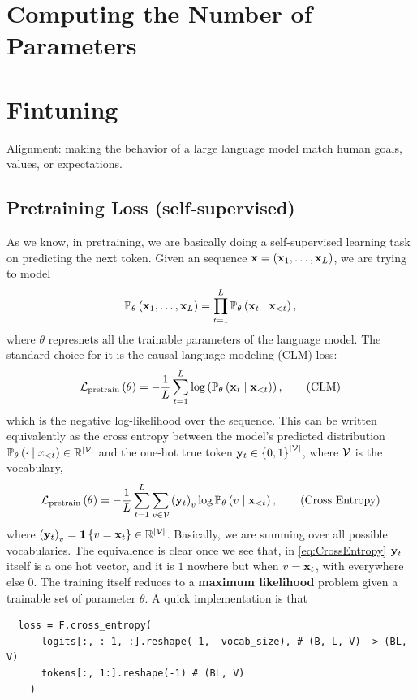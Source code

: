\documentclass[11pt]{article}  %
\begin{document}
\section{Computing the Number of Parameters}


\section{Fintuning}
Alignment: making the behavior of a large language model match human goals, values, or expectations.


\subsection{Pretraining Loss (self-supervised)}
As we know, in pretraining, we are basically doing a self-supervised learning task on predicting the next token.
Given an sequence $\mathbf{x} = (\mathbf{x}_1, \hdots, \mathbf{x}_L)$, we are trying to model 
\begin{align*}
  \mathbb{P}_{\theta}\left( \mathbf{x}_1, \hdots, \mathbf{x}_L \right) = \prod_{t=1}^L \mathbb{P}_{\theta}\left( \mathbf{x}_t \mid \mathbf{x}_{< t} \right),
\end{align*}
where $\theta$ represnets all the trainable parameters of the language model. 
The standard choice for it is the causal language modeling (CLM) loss:
\begin{align}
  \label{eq:CLM}
  \mathcal{L}_{\text{pretrain}} \left( \theta \right) = -\frac{1}{L}\sum_{t=1}^{L}\log\left( \mathbb{P}_{\theta}\left( \mathbf{x}_t \mid \mathbf{x}_{<t} \right) \right), \tag{CLM}
\end{align}
which is the negative log-likelihood over the sequence.
This can be written equivalently as the cross entropy between the model's predicted distribution $\mathbb{P}_{\theta}\left( \cdot \mid x_{< t} \right) \in \mathbb{R}^{\lvert\mathcal{V} \rvert}$ and the one-hot true token $\mathbf{y}_t \in \left\{ 0, 1 \right\}^{\lvert\mathcal{V} \rvert}$, where $\mathcal{V}$ is the vocabulary,
\begin{align}
  \label{eq:CrossEntropy}
  \mathcal{L}_{\text{pretrain}}\left( \theta \right) = -\frac{1}{L}\sum_{t=1}^{L}\sum_{v \in \mathcal{V}} \left( \mathbf{y}_{t} \right)_v \log \mathbb{P}_{\theta}\left( v \mid \mathbf{x}_{<t} \right), \tag{Cross Entropy}
\end{align} 
where $\left( \mathbf{y}_t \right)_v = \mathbf{1}\left\{ v = \mathbf{x}_t \right\} \in \mathbb{R}^{\lvert\mathcal{V}\rvert}$.
Basically, we are summing over all possible vocabularies.
The equivalence is clear once we see that, in \eqref{eq:CrossEntropy} $\mathbf{y}_t$ itself is a one hot vector, and it is $1$ nowhere but when $v = \mathbf{x}_t$, with everywhere else $0$.
The training itself reduces to a \textbf{maximum likelihood} problem given a trainable set of parameter $\theta$.  
A quick implementation is that 
\begin{verbatim}
  loss = F.cross_entropy(
      logits[:, :-1, :].reshape(-1,  vocab_size), # (B, L, V) -> (BL, V)
      tokens[:, 1:].reshape(-1) # (BL, V)
    )
\end{verbatim}
\end{document}
